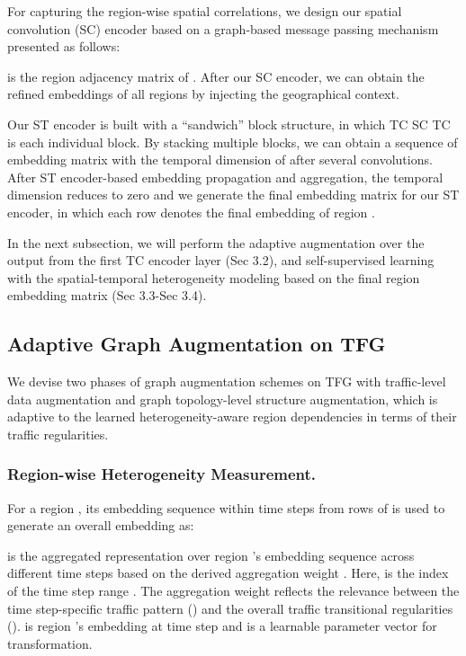 \documentclass[letterpaper]{article} \usepackage{aaai23}  \usepackage{times}  \usepackage{helvet}  \usepackage{courier}  \usepackage[hyphens]{url}  \usepackage{graphicx} \urlstyle{rm} \def\UrlFont{\rm}  \usepackage{natbib}  \usepackage{caption} \frenchspacing  \setlength{\pdfpagewidth}{8.5in} \setlength{\pdfpageheight}{11in}
\begin{document}
For capturing the region-wise spatial correlations, we design our spatial convolution (SC) encoder based on a graph-based message passing mechanism presented as follows:

\noindent  is the region adjacency matrix of . After our SC encoder, we can obtain the refined embeddings  of all regions by injecting the geographical context.



Our ST encoder is built with a ``sandwich'' block structure, in which TC  SC  TC is each individual block. By stacking multiple blocks, we can obtain a sequence of embedding matrix  with the temporal dimension of  after several convolutions. After ST encoder-based embedding propagation and aggregation, the temporal dimension  reduces to zero and we generate the final embedding matrix  for our ST encoder, in which each row  denotes the final embedding of region . 

In the next subsection, we will perform the adaptive augmentation over the  output from the first TC encoder layer (Sec 3.2), and self-supervised learning with the spatial-temporal heterogeneity modeling based on the final region embedding matrix  (Sec 3.3-Sec 3.4).





\subsection{Adaptive Graph Augmentation on TFG}



We devise two phases of graph augmentation schemes on TFG  with traffic-level data augmentation and graph topology-level structure augmentation, which is adaptive to the learned heterogeneity-aware region dependencies in terms of their traffic regularities.

\subsubsection{Region-wise Heterogeneity Measurement.} 
For a region , its embedding sequence  within  time steps from rows of  is used to generate an overall embedding as:

\noindent  is the aggregated representation over region 's embedding sequence across different time steps based on the derived aggregation weight . Here,  is the index of the time step range . The aggregation weight  reflects the relevance between the time step-specific traffic pattern () and the overall traffic transitional regularities ().  is region 's embedding at time step  and  is a learnable parameter vector for transformation.
\end{document}
